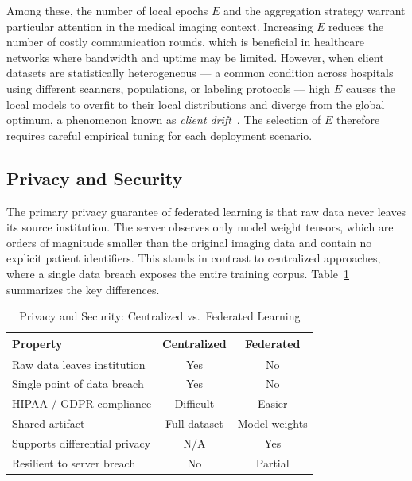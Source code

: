 Among these, the number of local epochs $E$ and the aggregation strategy
warrant particular attention in the medical imaging context. Increasing $E$
reduces the number of costly communication rounds, which is beneficial in
healthcare networks where bandwidth and uptime may be limited. However,
when client datasets are statistically heterogeneous — a common condition
across hospitals using different scanners, populations, or labeling protocols
— high $E$ causes the local models to overfit to their local distributions
and diverge from the global optimum, a phenomenon known as \textit{client
drift}~\cite{li2020}. The selection of $E$ therefore requires careful
empirical tuning for each deployment scenario.
 
\subsection{Privacy and Security}
\label{subsec:fl_privacy}
 
The primary privacy guarantee of federated learning is that raw data never
leaves its source institution. The server observes only model weight tensors,
which are orders of magnitude smaller than the original imaging data and
contain no explicit patient identifiers. This stands in contrast to
centralized approaches, where a single data breach exposes the entire
training corpus. Table~\ref{tab:privacy_comparison} summarizes the key
differences.
 
\begin{table}[ht]
\centering
\caption{Privacy and Security: Centralized vs.\ Federated Learning}
\label{tab:privacy_comparison}
\begin{tabular}{|l|c|c|}
\hline
\textbf{Property} & \textbf{Centralized} & \textbf{Federated} \\
\hline
Raw data leaves institution   & Yes        & No              \\
Single point of data breach   & Yes        & No              \\
HIPAA / GDPR compliance       & Difficult  & Easier          \\
Shared artifact               & Full dataset & Model weights \\
Supports differential privacy & N/A        & Yes             \\
Resilient to server breach    & No         & Partial         \\
\hline
\end{tabular}
\end{table}
 
